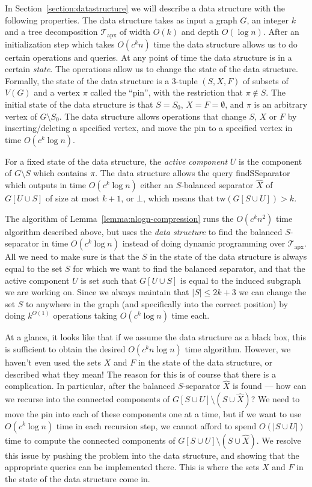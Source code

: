 \documentclass[a4paper,11pt]{article}
\theoremstyle{definition}
\theoremstyle{remark}
\newcommand{\qSsep}{\textnormal{findSSeparator}}
\newcommand{\pin}{\pi}
\newcommand{\td}{\mathcal{T}} \newcommand{\tw}{\mathrm{tw}} \newcommand{\w}{\mathrm{w}}
\newcommand{\apx}{\textrm{apx}}
\begin{document}
In Section~\ref{section:datastructure} we will describe a data
structure with the following properties.  The data structure takes as
input a graph $G$, an integer $k$ and a tree decomposition $\td_\apx$
of width $O(k)$ and depth $O(\log n)$.  After an initialization step
which takes $O(c^kn)$ time the data structure allows us to do certain
operations and queries.  At any point of time the data structure is in
a certain {\em state}.  The operations allow us to change the state of
the data structure.  Formally, the state of the data structure is a
$3$-tuple $(S,X,F)$ of subsets of $V(G)$ and a vertex $\pin$ called
the ``pin'', with the restriction that $\pin \notin S$.  The initial
state of the data structure is that $S=S_0$, $X = F = \emptyset$, and
$\pin$ is an arbitrary vertex of $G\setminus S_0$.  The data structure
allows operations that change $S$, $X$ or $F$ by inserting/deleting a
specified vertex, and move the pin to a specified vertex in time
$O(c^k\log n)$.

For a fixed state of the data structure, the {\em active component}
$U$ is the component of $G \setminus S$ which contains $\pin$.  The
data structure allows the query \qSsep{} which outputs in time $O(c^k
\log n)$ either an $S$-balanced separator $\hat{X}$ of $G[U \cup S]$
of size at most $k+1$, or $\bot$, which means that $\tw(G[S \cup U]) > k$.

The algorithm of Lemma~\ref{lemma:nlogn-compression} runs the
$O(c^kn^2)$ time algorithm described above, but uses the \emph{data
  structure} to find the balanced $S$-separator in time $O(c^k \log
n)$ instead of doing dynamic programming over $\td_\apx$.  All we need
to make sure is that the $S$ in the state of the data structure is
always equal to the set $S$ for which we want to find the balanced
separator, and that the active component $U$ is set such that $G[U
\cup S]$ is equal to the induced subgraph we are working on.  Since we
always maintain that $|S| \leq 2k+3$ we can change the set $S$ to
anywhere in the graph (and specifically into the correct position) by
doing $k^{O(1)}$ operations taking $O(c^k \log n)$ time each.

At a glance, it looks like that if we assume the data structure as a
black box, this is sufficient to obtain the desired $O(c^k n\log n)$
time algorithm.  However, we haven't even used the sets $X$ and $F$ in
the state of the data structure, or described what they mean! The
reason for this is of course that there is a complication.  In
particular, after the balanced $S$-separator $\hat{X}$ is found ---
how can we recurse into the connected components of $G[S \cup U]
\setminus (S \cup \hat{X})$? We need to move the pin into each of
these components one at a time, but if we want to use $O(c^k \log n)$
time in each recursion step, we cannot afford to spend $O(|S \cup U|)$
time to compute the connected components of $G[S \cup U] \setminus (S
\cup \hat{X})$.  We resolve this issue by pushing the problem into the
data structure, and showing that the appropriate queries can be
implemented there.  This is where the sets $X$ and $F$ in the state of
the data structure come in.
\end{document}
